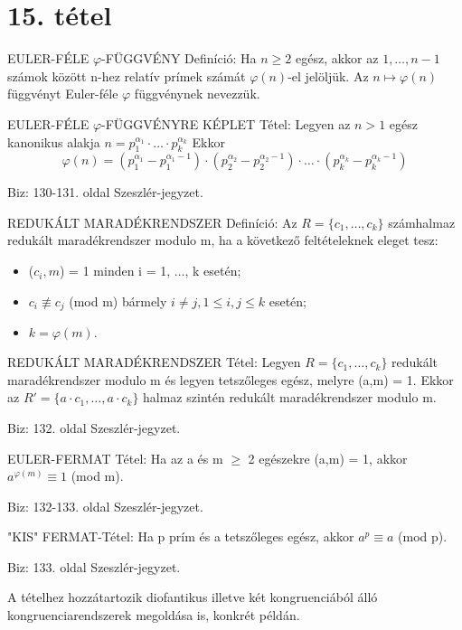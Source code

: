 \section{15. tétel}

\begin{definicio}{
EULER-FÉLE $\varphi$-FÜGGVÉNY Definíció}: Ha $n \geq 2$ egész, akkor az $1,\ldots,n-1$ számok között n-hez relatív prímek számát $\varphi(n)$-el jelöljük. Az $n\mapsto\varphi(n)$ függvényt Euler-féle $\varphi$ függvénynek nevezzük.
\end{definicio}
\begin{tetel}{
EULER-FÉLE $\varphi$-FÜGGVÉNYRE KÉPLET Tétel}: Legyen az $n > 1$ egész kanonikus alakja $n = p_1^{\alpha_1} \cdot \ldots \cdot p_k^{\alpha_k}$ Ekkor $$\varphi(n) = \left(p_1^{\alpha_1} - p_1^{\alpha_1-1}\right) \cdot \left(p_2^{\alpha_2} - p_2^{\alpha_2-1}\right) \cdot \ldots \cdot
\left(p_k^{\alpha_k} - p_k^{\alpha_k-1}\right)$$
\end{tetel}
\begin{leftbar}
Biz: 130-131. oldal Szeszlér-jegyzet.
\end{leftbar}
\begin{definicio}{
REDUKÁLT MARADÉKRENDSZER Definíció}: Az $R = \{c_1, \ldots, c_k\}$ számhalmaz redukált maradékrendszer modulo m, ha a következő feltételeknek eleget tesz:
\begin{itemize}
\item ($c_i, m$) = 1 minden i = 1, $\ldots$, k esetén;
\item $c_i \not \equiv c_j$ (mod m) bármely $i \neq j, 1 \leq i, j \leq k$ esetén;
\item $k = \varphi(m).$
\end{itemize}
\end{definicio}
\begin{tetel}{
REDUKÁLT MARADÉKRENDSZER Tétel}: Legyen $R = \{c_1, \ldots, c_k\}$ redukált maradékrendszer modulo m és legyen tetszőleges egész, melyre (a,m) = 1. Ekkor az $R' = \{a\cdot c_1, \ldots, a \cdot c_k\}$ halmaz szintén redukált maradékrendszer modulo m.
\end{tetel}
\begin{leftbar}
Biz: 132. oldal Szeszlér-jegyzet.
\end{leftbar}
\begin{tetel}{
EULER-FERMAT Tétel}: Ha az a és m $\geq$ 2 egészekre (a,m) = 1, akkor $a^{\varphi(m)} \equiv 1$ (mod m).
\end{tetel}
\begin{leftbar}
Biz: 132-133. oldal Szeszlér-jegyzet.
\end{leftbar}
\begin{tetel}{
"KIS" FERMAT-Tétel}: Ha p prím és a tetszőleges egész, akkor $a^p \equiv a$ (mod p).
\end{tetel}
\begin{leftbar}
Biz: 133. oldal Szeszlér-jegyzet.
\end{leftbar}
A tételhez hozzátartozik diofantikus illetve két kongruenciából álló kongruenciarendszerek megoldása is, konkrét példán.

